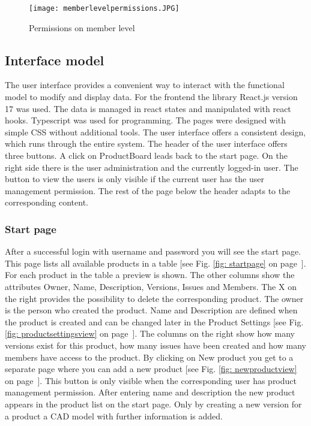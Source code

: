     \begin{figure}[h]
        \centering
        \texttt{[image: memberlevelpermissions.JPG]}
        \caption{Permissions on member level}
        \label{tab: memberlevelpermissions}
    \end{figure}
    
    \subsection*{Interface model} 
    The user interface provides a convenient way to interact with the functional model to modify and display data. For the frontend the library React.js version 17 was used. The data is managed in react states and manipulated with react hooks. Typescript was used for programming. The pages were designed with simple CSS without additional tools. The user interface offers a consistent design, which runs through the entire system. The header of the user interface offers three buttons. A click on ProductBoard leads back to the start page. On the right side there is the user administration and the currently logged-in user. The button to view the users is only visible if the current user has the user management permission. The rest of the page below the header adapts to the corresponding content.

    \subsubsection*{Start page}
    After a successful login with username and password you will see the start page. This page lists all available products in a table [see Fig. \ref{fig: startpage} on page~\pageref{fig: startpage}]. For each product in the table a preview is shown. The other columns show the attributes Owner, Name, Description, Versions, Issues and Members. The X on the right provides the possibility to delete the corresponding product. The owner is the person who created the product. Name and Description are defined when the product is created and can be changed later in the Product Settings [see Fig. \ref{fig: productsettingsview} on page~\pageref{fig: productsettingsview}]. The columns on the right show how many versions exist for this product, how many issues have been created and how many members have access to the product. By clicking on New product you get to a separate page where you can add a new product [see Fig. \ref{fig: newproductview} on page~\pageref{fig: newproductview}]. This button is only visible when the corresponding user has product management permission. After entering name and description the new product appears in the product list on the start page. Only by creating a new version for a product a CAD model with further information is added.

